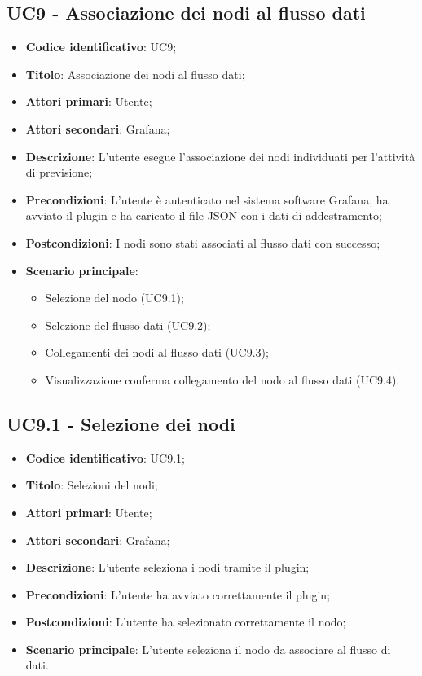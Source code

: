 \subsection{UC9 - Associazione dei nodi al flusso dati}
\begin{itemize}
	\item \textbf{Codice identificativo}: UC9;
	\item \textbf{Titolo}: Associazione dei nodi al flusso dati;
	\item \textbf{Attori primari}: Utente;
	\item \textbf{Attori secondari}: Grafana\glo;
	\item \textbf{Descrizione}: L'utente esegue l'associazione dei nodi individuati per l'attività di previsione;
	\item \textbf{Precondizioni}: L'utente è autenticato nel sistema software Grafana\glosp, ha avviato il plugin e ha caricato il file JSON con i dati di addestramento;
	\item \textbf{Postcondizioni}: I nodi sono stati associati al flusso dati con successo;
	\item \textbf{Scenario principale}: 
		\begin{itemize}
			\item Selezione del nodo (UC9.1);
			\item Selezione del flusso dati (UC9.2);
			\item Collegamenti dei nodi al flusso dati (UC9.3);
			\item Visualizzazione conferma collegamento del nodo al flusso dati (UC9.4).
		\end{itemize}
\end{itemize}

\subsection{UC9.1 - Selezione dei nodi}
\begin{itemize}
	\item \textbf{Codice identificativo}: UC9.1;
	\item \textbf{Titolo}: Selezioni del nodi;
	\item \textbf{Attori primari}: Utente;
	\item \textbf{Attori secondari}: Grafana\glo;
	\item \textbf{Descrizione}: L'utente seleziona i nodi tramite il plugin;
	\item \textbf{Precondizioni}: L'utente ha avviato correttamente il plugin;
	\item \textbf{Postcondizioni}: L'utente ha selezionato correttamente il nodo;
	\item \textbf{Scenario principale}: L'utente seleziona il nodo da associare al flusso di dati.
\end{itemize}

